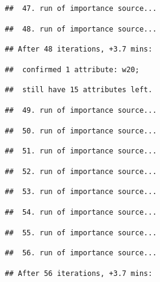 \documentclass[
]{article}
\begin{document}
\begin{verbatim}
##  47. run of importance source...
\end{verbatim}

\begin{verbatim}
##  48. run of importance source...
\end{verbatim}

\begin{verbatim}
## After 48 iterations, +3.7 mins:
\end{verbatim}

\begin{verbatim}
##  confirmed 1 attribute: w20;
\end{verbatim}

\begin{verbatim}
##  still have 15 attributes left.
\end{verbatim}

\begin{verbatim}
##  49. run of importance source...
\end{verbatim}

\begin{verbatim}
##  50. run of importance source...
\end{verbatim}

\begin{verbatim}
##  51. run of importance source...
\end{verbatim}

\begin{verbatim}
##  52. run of importance source...
\end{verbatim}

\begin{verbatim}
##  53. run of importance source...
\end{verbatim}

\begin{verbatim}
##  54. run of importance source...
\end{verbatim}

\begin{verbatim}
##  55. run of importance source...
\end{verbatim}

\begin{verbatim}
##  56. run of importance source...
\end{verbatim}

\begin{verbatim}
## After 56 iterations, +3.7 mins:
\end{verbatim}
\end{document}
